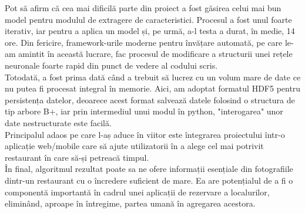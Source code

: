 Pot să afirm că cea mai dificilă parte din proiect a fost găsirea celui mai bun model pentru modulul de extragere de caracteristici. Procesul a fost unul foarte iterativ, iar pentru a aplica un model și, pe urmă, a-l testa a durat, în medie, 14 ore. Din fericire, framework-urile moderne pentru învățare automată, pe care le-am amintit în această lucrare, fac procesul de modificare a structurii unei rețele neuronale foarte rapid din punct de vedere al codului scris. \\

Totodată, a fost prima dată când a trebuit să lucrez cu un volum mare de date ce nu putea fi procesat integral în memorie. Aici, am adoptat formatul HDF5 pentru persistența datelor, deoarece acest format salvează datele folosind o structura de tip arbore B+, iar prin intermediul unui modul în python, "interogarea" unor date nestructurate este facilă. \\

Principalul adaos pe care l-aș aduce în viitor este întegrarea proiectului într-o aplicație web/mobile care să ajute utilizatorii în a alege cel mai potrivit restaurant în care să-și petreacă timpul. \\

În final, algoritmul rezultat poate sa ne ofere informații esențiale din fotografiile dintr-un restaurant cu o încredere suficient de mare. Ea are potențialul de a fi o componentă importantă în cadrul unei aplicații de rezervare a localurilor, eliminând, aproape în întregime, partea umană în agregarea acestora. 